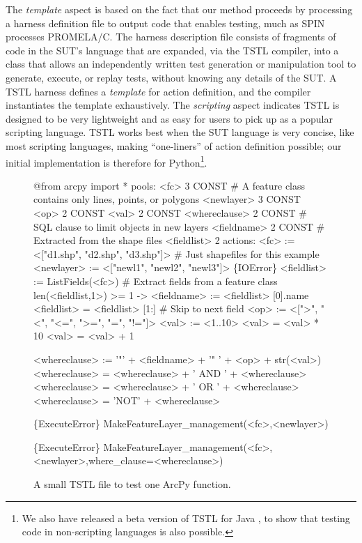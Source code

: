 The \emph{template} aspect is based on the fact that our method
proceeds by processing a harness definition file to output code that
enables testing, much  as SPIN processes PROMELA/C.  The harness
description file consists of fragments of code in the SUT's language
that are expanded, via the TSTL compiler, into a class that allows
an independently written test generation or manipulation tool to
generate, execute, or replay tests, without knowing
any details of the SUT.
A TSTL harness defines a \emph{template} for action definition, and
the compiler 
instantiates the template exhaustively.  The \emph{scripting} aspect indicates
TSTL is designed to be very lightweight and as easy for
users to pick up as a popular scripting language.  TSTL
works best when the SUT language is very
concise, like most scripting languages, making ``one-liners'' of action
definition possible; our initial implementation \cite{tstl} is therefore for
Python\footnote{We also have released a beta version of TSTL for Java \cite{TSTLJava}, to show
 that testing code in non-scripting languages is also possible.}.

\begin{figure}
{\scriptsize
\begin{code}
@from arcpy import *
\vspace{0.1in}
pools:
  <fc> 3 CONST             \# A feature class contains only lines, points, or polygons
  <newlayer> 3 CONST
  <op> 2 CONST 
  <val> 2 CONST
  <whereclause> 2 CONST    \# SQL clause to limit objects in new layers
  <fieldname> 2 CONST      \# Extracted from the shape files
  <fieldlist> 2
\vspace{0.1in}
actions:
\vspace{0.1in}
<fc> := <["d1.shp", "d2.shp", "d3.shp"]>  \# Just shapefiles for this example
<newlayer> := <["newl1", "newl2", "newl3"]>
\vspace{0.05in}
\{IOError\} <fieldlist> := ListFields(<fc>) \# Extract fields from a feature class
len(<fieldlist,1>) >= 1 -> <fieldname> := <fieldlist> [0].name 
<fieldlist> = <fieldlist> [1:] \# Skip to next field
\vspace{0.05in}
<op> := <[">", "<", "<=", ">=", "=", "!="]>
<val> := <1..10>
<val> = <val> * 10
<val> = <val> + 1

<whereclause> := '"' + <fieldname> + '" ' + <op> + str(<val>)
<whereclause> = <whereclause> + ' AND ' + <whereclause>
<whereclause> = <whereclause> + ' OR ' +  <whereclause>
<whereclause> = 'NOT' + <whereclause>

\{ExecuteError\} MakeFeatureLayer\_management(<fc>,<newlayer>)

\{ExecuteError\} MakeFeatureLayer\_management(<fc>,<newlayer>,where\_clause=<whereclause>)
\end{code}
}
\caption{A small TSTL file to test one ArcPy function.}
\label{fig:makefeaturelayer}
\end{figure}


